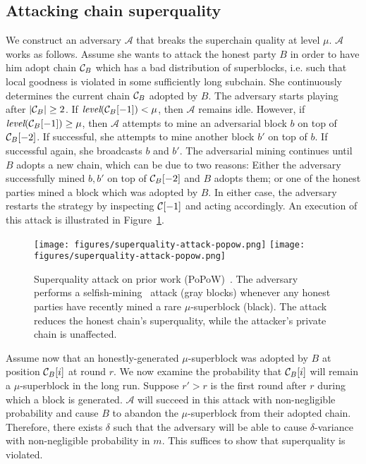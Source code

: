 \subsection{Attacking chain superquality}
\label{subsec:superquality-attack}
We construct an adversary $\mathcal{A}$ that breaks the superchain quality at level $\mu$.
$\mathcal{A}$ works as follows. Assume she wants to attack the honest party $B$
in order to have him adopt chain $\mathcal{C}_B$ which has a bad distribution of
superblocks, i.e. such that local goodness is violated in some sufficiently long
subchain. She continuously determines the current chain $\mathcal{C}_B$ adopted by
$B$. The adversary starts playing after $|\mathcal{C}_B| \geq 2$. If
$\emph{level}(\mathcal{C}_B[-1]) < \mu$, then $\mathcal{A}$ remains idle. However,
if $\emph{level}(\mathcal{C}_B[-1]) \geq \mu$, then $\mathcal{A}$ attempts to mine
an adversarial block $b$ on top of $\mathcal{C}_B[-2]$. If successful,  she attempts
to mine another block $b'$ on top of $b$. If successful again, she broadcasts
$b$ and $b'$. The adversarial mining continues until $B$ adopts a new chain,
which can be due to two reasons: Either the adversary successfully mined $b, b'$
on top of $\mathcal{C}_B[-2]$ and $B$ adopts them; or one of the honest parties mined
a block which was adopted by $B$. In either case, the adversary restarts
the strategy by inspecting $\mathcal{C}[-1]$ and acting accordingly. An execution of
this attack is illustrated in Figure~\ref{fig.superquality-attack}.

\begin{figure}[h]
    \caption{Superquality attack on prior work (PoPoW)~\cite{KLS}.
    The adversary performs a selfish-mining~\cite{selfish} attack (gray blocks)
    whenever any honest parties have recently mined a rare $\mu$-superblock
    (black). The attack reduces the honest chain's superquality, while the
    attacker's private chain is unaffected. }
    \centering
    \iftwocolumn
        \texttt{[image: figures/superquality-attack-popow.png]}
    \else
        \texttt{[image: figures/superquality-attack-popow.png]}
    \fi
    \label{fig.superquality-attack}
\end{figure}

Assume now that an honestly-generated $\mu$-superblock was adopted by $B$ at
position $\mathcal{C}_B[i]$ at round $r$. We now examine the probability that
$\mathcal{C}_B[i]$ will remain a $\mu$-superblock in the long run. Suppose $r' > r$
is the first round after $r$ during which a block is generated. $\mathcal{A}$
will succeed in this attack with non-negligible probability and cause $B$ to
abandon the $\mu$-superblock from their adopted chain. Therefore, there
exists $\delta$ such that the adversary will be able to cause $\delta$-variance
with non-negligible probability in $m$. This suffices to show that superquality
is violated.

